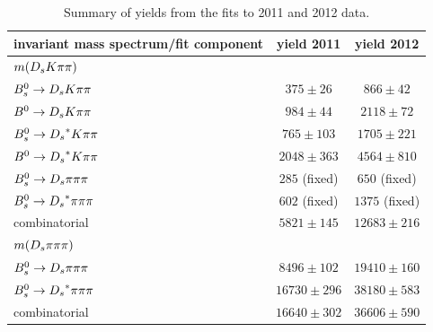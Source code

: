 \begin{table}[h]
\centering
\begin{tabular}{l c c}
invariant mass spectrum/fit component & yield 2011 & yield 2012\\
\hline \hline
$m({{D}_{s}}{K}{\pi}{\pi})$    &                  &\\
\hline
${{B}^0_{s}}\rightarrow{\ensuremath{{D}_{s}}}{\ensuremath{K}}{\ensuremath{\pi}}{\ensuremath{\pi}}$    &  $375 \pm 26$   &  $866 \pm 42$\\
${{B}^0}\rightarrow{\ensuremath{{D}_{s}}}{\ensuremath{K}}{\ensuremath{\pi}}{\ensuremath{\pi}}$    &  $984 \pm 44$   &  $2118 \pm 72$\\
${{B}^0_{s}}\rightarrow{\ensuremath{{D}_{s}}}^{*}{K}{\pi}{\pi}$ &  $765 \pm 103$   &  $1705 \pm 221$\\
${{B}^0}\rightarrow{\ensuremath{{D}_{s}}}^{*}{K}{\pi}{\pi}$ &  $2048 \pm 363$   &  $4564 \pm 810$\\
${{B}^0_{s}}\rightarrow{\ensuremath{{D}_{s}}}{\ensuremath{\pi}}{\ensuremath{\pi}}{\ensuremath{\pi}}$    &  $285$ (fixed)      & $650$ (fixed)\\
${{B}^0_{s}}\rightarrow{\ensuremath{{D}_{s}}}^{*}{\pi}{\pi}{\pi}$ &  $602$ (fixed)      & $1375$ (fixed)\\
combinatorial                 &  $5821 \pm 145$  & $12683 \pm 216$\\
\hline \hline
$m({{D}_{s}}{\pi}{\pi}{\pi})$       &                  &\\
\hline
${{B}^0_{s}}\rightarrow{\ensuremath{{D}_{s}}}{\ensuremath{\pi}}{\ensuremath{\pi}}{\ensuremath{\pi}}$    &  $8496 \pm 102$  &  $19410 \pm 160$\\
${{B}^0_{s}}\rightarrow{\ensuremath{{D}_{s}}}^{*}{\pi}{\pi}{\pi}$ & $16730 \pm 296$  & $38180 \pm 583$\\
combinatorial                 & $16640 \pm 302$  & $36606 \pm 590$\\
\hline
\end{tabular}
\caption{Summary of yields from the fits to 2011 and 2012 data.}
\label{tab: SigYields}
\end{table}

